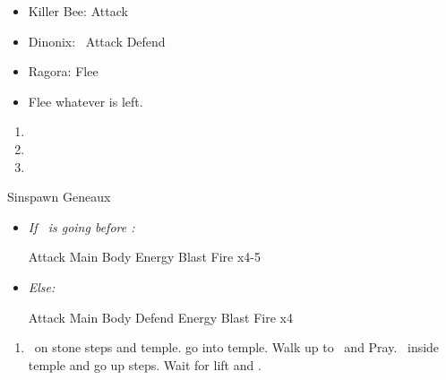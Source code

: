 \begin{encounters}
  \begin{itemize}
    \item Killer Bee: \wakkaf Attack
    \item Dinonix: \tidus\ Attack
    \yunaf Defend
    \item Ragora: Flee
    \item Flee whatever is left.
  \end{itemize}
\end{encounters}
\begin{enumerate}[resume]
  \item \sd
  \item \formation{\tidus}{\yuna}{\wakka}
  \item \save
\end{enumerate}
\begin{battle}[3000]{Sinspawn Geneaux}
  \begin{itemize}
    \item \textit{If \tidus\ is going before \yuna:}
          \begin{itemize}
            \tidusf Attack Main Body
            \summon{\valefor}
            \valeforf Energy Blast \od
            \valeforf Fire x4-5
          \end{itemize}
    \item \textit{Else:}
          \begin{itemize}
            \switch{\yuna}{\kimahri}
            \kimahrif Attack Main Body
            \tidusf Defend
            \summon{\valefor}
            \valeforf Energy Blast \od
            \valeforf Fire x4
          \end{itemize}
  \end{itemize}
\end{battle}
\begin{enumerate}[resume]
  \item \sd\ on stone steps and temple. go into temple. Walk up to \wakka\ and Pray. \sd\ inside temple and go up steps. Wait for lift and \sd.
\end{enumerate}
